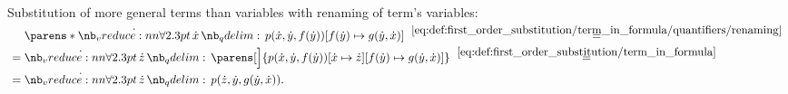 \begin{example}
\begin{thmenum}
     Substitution of more general terms than variables with renaming of term's variables:
    \begin{align*}
      &\phantom{{}={}}
      \parens*{\qforall \synx p(\synx, \syny, f(\syny))}[f(\syny) \mapsto g(\syny, \synx)]
      \reloset {\eqref{eq:def:first_order_substitution/term_in_formula/quantifiers/renaming}} = \\ &=
      \qforall \synz \parens[\Big]{p(\synx, \syny, f(\syny))[\synx \mapsto \synz][f(\syny) \mapsto g(\syny, \synx)]}
      \reloset {\eqref{eq:def:first_order_substitution/term_in_formula}} = \\ &=
      \qforall \synz p(\synz, \syny, g(\syny, \synx)).
    \end{align*}
  \end{thmenum}
\end{example}

